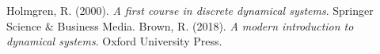 \documentclass[conference]{IEEEtran}
\begin{document}
%    
%
%    
%    
    
    
\begin{thebibliography}{00}
 Holmgren, R. (2000). \textit{A first course in discrete dynamical systems}. Springer Science \& Business Media.
 Brown, R. (2018). \textit{A modern introduction to dynamical systems}. Oxford University Press.
\end{thebibliography}
\end{document}
